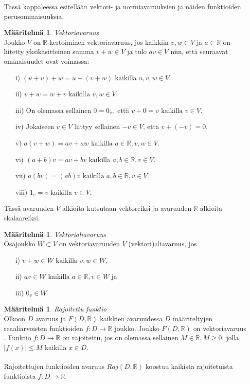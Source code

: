 \documentclass[12pt,a4paper,leqno]{report}
\newcommand{\R}{\mathbb{R}}
\newcommand{\N}{\mathbb{N}}
\theoremstyle{plain}
\theoremstyle{definition}
\newtheorem{maar}[equation]{Määritelmä}
\newtheorem{esim}[equation]{Esimerkki}
\theoremstyle{remark}
\begin{document}
Tässä kappaleessa esitellään vektori- ja normiavaruuksien ja näiden funktioiden perusominaisuuksia. \cite{Topo1}
\begin{maar}
\emph{Vektoriavaruus}\\
Joukko $V$ on $\R$-kertoiminen vektoriavaruus, jos kaikkiin $v,w\in V$ ja $a\in \R$ on liitetty yksikäsitteinen summa $v+w\in V$ ja tulo $av\in V$ niin, että seuraavat ominaisuudet ovat voimassa:
\begin{itemize}
\item[i)\phantom{iiv}] $(u+v)+w=u+(v+w)\text{ kaikilla }u,v,w\in V.$
\item[ii)\phantom{iv}] $v+w=w+v\text{ kaikilla }v,w\in V.$
\item[iii)\phantom{v}] On olemassa sellainen $0=0_{v},$ että $v+0=v\text{ kaikilla }v\in V.$
\item[iv)\phantom{ii}] Jokaiseen $v\in V $ liittyy sellainen $-v\in V$, että $v+(-v)=0$.
\item[v)\phantom{iii}] $a(v+w)=av+aw\text{ kaikilla }a\in\R, v,w\in V.$
\item[vi)\phantom{ii}] $(a+b)v=av+bv\text{ kaikilla }a,b\in\R, v\in V.$
\item[vii)\phantom{i}] $a(bv)=(ab)v\text{ kaikilla }a,b\in\R, v\in V.$
\item[viii)] $1_{v}=v$ kaikilla $v\in V.$
\end{itemize}
Tässä avaruuden $V$ alkioita kutsutaan vektoreiksi ja avaruuden $\R$ alkioita skalaareiksi.

\end{maar}
\begin{maar}
\emph{Vektorialiavaruus}\\
Osajoukko $W\subset V$ on vektoriavaruuden $V$ (vektori)aliavaruus, jos
\begin{itemize}
\item[i)\phantom{iiv}] $v+w\in W\text{ kaikilla }v,w\in W,$
\item[ii)\phantom{iv}] $av\in W\text{ kaikilla }a\in\R, v\in W$ ja
\item[iii)\phantom{v}] $0_{v}\in W$
\end{itemize}

\end{maar}
\begin{maar}
\emph{Rajoitettu funktio}\\
Olkoon $D$ avaruus ja $F(D,\R)$ kaikkien avaruudessa $D$ määriteltyjen 
reaaliarvoisten funktioiden $f\colon D\rightarrow \R$ joukko. Joukko $F(D,\R)$ on vektoriavaruus \cite{Topo1}. %
Funktio $f\colon D\rightarrow \R$ on rajoitettu, 
jos on olemassa sellainen $M\in\R,M\geq 0$, 
jolla $|f(x)|\leq M$ kaikilla $x\in D$.\\\\
Rajoitettujen funktioiden avaruus $Raj(D,\R )$ koostuu kaikista rajoitetuista funktioista $f\colon D\rightarrow \R $.

\end{maar}
\end{document}
